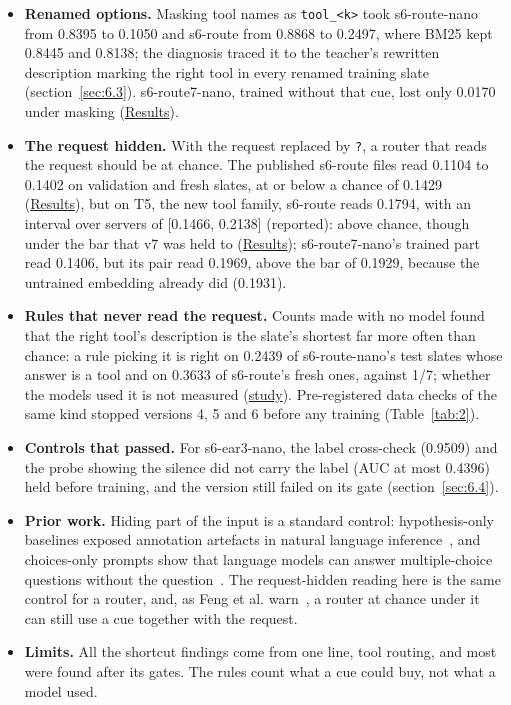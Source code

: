 \documentclass[10pt]{article}
\begin{document}
\begin{itemize}
\item \textbf{Renamed options.} Masking tool names as \texttt{tool\_\allowbreak{}<k>} took s6-route-nano from 0.8395 to 0.1050 and s6-route from 0.8868 to 0.2497, where BM25 kept 0.8445 and 0.8138; the diagnosis traced it to the teacher's rewritten description marking the right tool in every renamed training slate (section~\ref{sec:6.3}). s6-route7-nano, trained without that cue, lost only 0.0170 under masking (\href{https://maxgfr.github.io/skycmd/results/\#s6-route7-nano-failed}{Results}).
\item \textbf{The request hidden.} With the request replaced by \texttt{?}, a router that reads the request should be at chance. The published s6-route files read 0.1104 to 0.1402 on validation and fresh slates, at or below a chance of 0.1429 (\href{https://maxgfr.github.io/skycmd/results/\#s6-route-passed}{Results}), but on T5, the new tool family, s6-route reads 0.1794, with an interval over servers of [0.1466, 0.2138] (reported): above chance, though under the bar that v7 was held to (\href{https://maxgfr.github.io/skycmd/results/\#s6-route-passed}{Results}); s6-route7-nano's trained part read 0.1406, but its pair read 0.1969, above the bar of 0.1929, because the untrained embedding already did (0.1931).
\item \textbf{Rules that never read the request.} Counts made with no model found that the right tool's description is the slate's shortest far more often than chance: a rule picking it is right on 0.2439 of s6-route-nano's test slates whose answer is a tool and on 0.3633 of s6-route's fresh ones, against 1/7; whether the models used it is not measured (\href{https://github.com/maxgfr/skycmd/blob/main/docs/s6-route4-study.md}{study}). Pre-registered data checks of the same kind stopped versions 4, 5 and 6 before any training (Table~\ref{tab:2}).
\item \textbf{Controls that passed.} For s6-ear3-nano, the label cross-check (0.9509) and the probe showing the silence did not carry the label (AUC at most 0.4396) held before training, and the version still failed on its gate (section~\ref{sec:6.4}).
\item \textbf{Prior work.} Hiding part of the input is a standard control: hypothesis-only baselines exposed annotation artefacts in natural language inference~\cite{gururangan2018artifacts}, and choices-only prompts show that language models can answer multiple-choice questions without the question~\cite{balepur2024artifacts}. The request-hidden reading here is the same control for a router, and, as Feng et al. warn~\cite{feng2019partial}, a router at chance under it can still use a cue together with the request.
\item \textbf{Limits.} All the shortcut findings come from one line, tool routing, and most were found after its gates. The rules count what a cue could buy, not what a model used.
\end{itemize}
\end{document}
